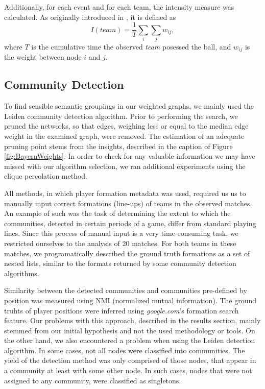 \documentclass[9pt,twocolumn,twoside]{pnas-report}
\begin{document}
{Additionally, for each event and for each team, the intensity measure was calculated. As originally introduced in \cite{grund}, it is defined as $$I(team) = \frac{1}{T} \sum_{i} \sum_{j} w_{ij},$$ where $T$ is the cumulative time the observed \emph{team} posessed the ball, and $w_{ij}$ is the weight between node $i$ and $j$.

\subsection*{Community Detection}
To find sensible semantic groupings in our weighted graphs, we mainly used the Leiden community detection algorithm. Prior to performing the search, we pruned the networks, so that edges, weighing less or equal to the  median edge weight in the examined graph, were removed. The estimation of an adequate pruning point stems from the insights, described in the caption of Figure \ref{fig:BayernWeights}. In order to check for any valuable information we may have missed with our algorithm selection, we ran additional experiments using the clique percolation method.

All methods, in which player formation metadata was used, required us us to manually input correct formations (line-ups) of teams in the observed matches. An example of such was the task of determining the extent to which the communities, detected in certain periods of a game, differ from standard playing lines.  Since this process of manual input is a very time-consuming task, we restricted ourselves to the analysis of 20 matches. For both teams in these matches, we programatically described the ground truth formations as a set of nested lists, similar to the formats returned by some community detection algorithms. 

Similarity between the detected communities and communities pre-defined by position was measured using NMI (normalized mutual information). The ground truhts of  player positions were inferred using \textit{google.com}'s formation search feature. Our problems with this approach, described in the results section, mainly stemmed from our initial hypothesis and not the used methodology or tools. On the other hand, we also encountered a problem when using the Leiden detection algorithm. In some cases, not all nodes were classified into communities. The yield of the detection method was only comprised of those nodes, that appear in a community at least with some other node. In such cases, nodes that were not assigned to any community, were classified as singletons.

}
\end{document}
